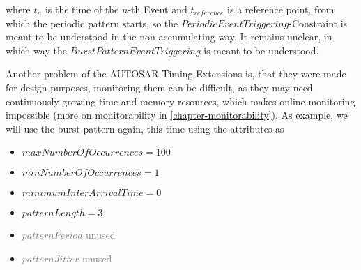 where $t_n$ is the time of the $n$-th Event and $t_{reference}$ is a reference point, from which the periodic pattern starts, so the $PeriodicEventTriggering$-Constraint is meant to be understood in the non-accumulating way. It remains unclear, in which way the $BurstPatternEventTriggering$ is meant to be understood.

Another problem of the AUTOSAR Timing Extensions is, that they were made for design purposes, monitoring them can be difficult, as they may need continuously growing time and memory resources, which makes online monitoring impossible (more on monitorability in \ref{chapter-monitorability}). As example, we will use the burst pattern again, this time using the attributes as
\begin{itemize}
	\item
		$maxNumberOfOccurrences = 100$
	\item
		$minNumberOfOccurrences = 1$
	\item
		$minimumInterArrivalTime = 0$
	\item
		$patternLength = 3$
	\item
		\textcolor{gray}{$patternPeriod$ unused}
	\item
		\textcolor{gray}{$patternJitter$ unused}
\end{itemize}
